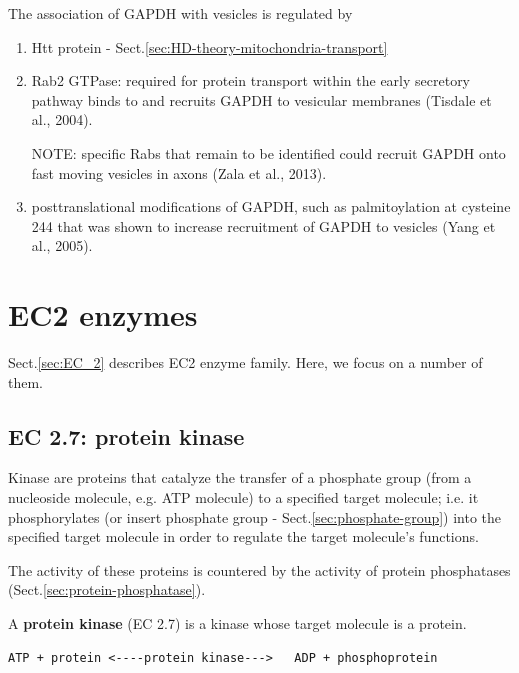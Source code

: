 The association of GAPDH with vesicles is regulated by
\begin{enumerate}
  \item Htt protein - Sect.\ref{sec:HD-theory-mitochondria-transport}
  
  \item Rab2 GTPase: required for protein transport within the early secretory
  pathway binds to and recruits GAPDH to vesicular membranes (Tisdale et al., 2004).

NOTE: specific Rabs that remain to be identified could recruit GAPDH onto fast
moving vesicles in axons (Zala et al., 2013).

  \item posttranslational modifications of GAPDH, such as palmitoylation at
  cysteine 244 that was shown to increase recruitment of GAPDH to vesicles (Yang
  et al., 2005).

\end{enumerate}


\chapter{EC2 enzymes}

Sect.\ref{sec:EC_2} describes EC2 enzyme family.
Here, we focus on a number of them.

\section{EC 2.7: protein kinase}
\label{sec:kinase}
\label{sec:protein-kinase}

Kinase are proteins that catalyze the transfer of a phosphate group (from a
nucleoside molecule, e.g. ATP molecule) to a specified target molecule; i.e. it
phosphorylates (or insert phosphate group - Sect.\ref{sec:phosphate-group}) into
the specified target molecule in order to regulate the target molecule's
functions. 

The activity of these proteins is countered by the activity of protein
phosphatases (Sect.\ref{sec:protein-phosphatase}).

A {\bf protein kinase} (EC 2.7) is a kinase whose target molecule is a protein.
\begin{verbatim}
ATP + protein <----protein kinase--->   ADP + phosphoprotein
\end{verbatim}

